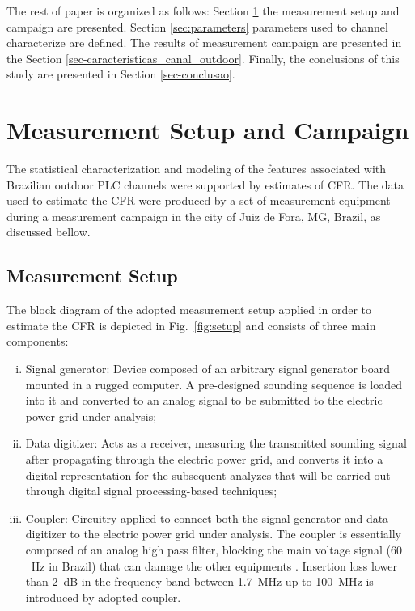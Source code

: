 \documentclass[journal]{IEEEtran}
\begin{document}
The rest of paper is organized as follows: Section \ref{sec:campaign} the measurement setup and campaign are presented. Section \ref{sec:parameters} parameters used to channel characterize are defined. The results of measurement campaign are presented in the Section \ref{sec-caracteristicas_canal_outdoor}. Finally, the conclusions of this study are presented in Section \ref{sec-conclusao}.

\section{Measurement Setup and Campaign}
\label{sec:campaign}

The statistical characterization and modeling of the features associated with Brazilian outdoor PLC channels were supported by estimates of \ac{CFR}. The data used to estimate the CFR were produced by a set of measurement equipment during a measurement campaign in the city of Juiz de Fora, MG, Brazil, as discussed bellow.

\subsection{Measurement Setup}

The block diagram of the adopted measurement setup applied in order to estimate the \ac{CFR} is depicted in Fig.~\ref{fig:setup} and consists of three main components:
\begin{enumerate}[(i)]
\item Signal generator: Device composed of an arbitrary signal generator board mounted in a rugged computer.
A pre-designed sounding sequence is loaded into it and converted to an analog signal to be submitted to the electric power grid under analysis;
\item Data digitizer: Acts as a receiver, measuring the transmitted sounding signal after propagating through the electric power grid,
and converts it into a digital representation for the subsequent analyzes that will be carried out through digital signal processing-based techniques;
\item Coupler: Circuitry applied to connect both the signal generator and data digitizer to the electric power grid under analysis.
The coupler is essentially composed of an analog high pass filter, blocking the main voltage signal ($60$~Hz in Brazil) that can damage the other equipments \cite{SilvaCosta2017}. Insertion loss lower than 2~dB in the frequency band between 1.7~MHz up to 100~MHz is introduced by adopted coupler.
\end{enumerate}
\end{document}
